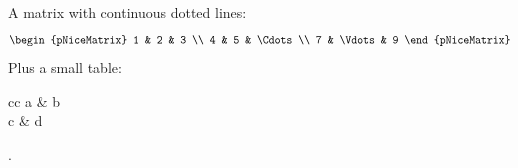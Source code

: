 \documentclass{article}
\begin{document}
A matrix with continuous dotted lines:
\[
\begin{pNiceMatrix}
1 & 2 & 3 \\
4 & 5 & \Cdots \\
7 & \Vdots & 9
\end{pNiceMatrix}
\]
Plus a small table: \begin{NiceTabular}{cc} a & b \\ c & d \end{NiceTabular}.
\end{document}
